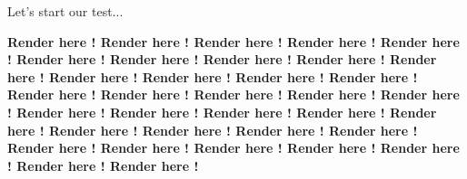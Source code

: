 \documentclass[a4,12pt]{article}
\begin{document}
\makeatletter
    \@build@layout{}
\makeatother

Let's start our test...

\lipsum

\lipsum[1]

\newpage

\makeatletter
    \@add@render{}
\makeatother

\textbf{Render here ! Render here ! Render here ! Render here ! Render here !
Render here ! Render here ! Render here ! Render here ! Render here !
Render here ! Render here ! Render here ! Render here ! Render here !
Render here ! Render here ! Render here ! Render here ! Render here !
Render here ! Render here ! Render here ! Render here ! Render here !
Render here ! Render here ! Render here ! Render here ! Render here !
Render here ! Render here ! Render here ! Render here ! Render here !}

\lipsum
\end{document}
